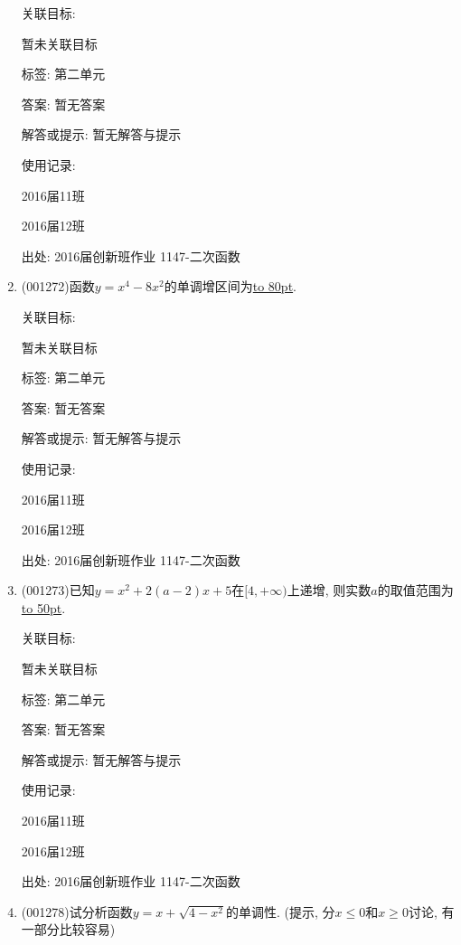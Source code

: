 \documentclass[10pt,a4paper]{article}
\newcommand{\blank}[1]{\underline{\hbox to #1pt{}}}
\begin{document}
\begin{enumerate}[1.]
关联目标:

暂未关联目标



标签: 第二单元

答案: 暂无答案

解答或提示: 暂无解答与提示

使用记录:

2016届11班				

2016届12班				


出处: 2016届创新班作业	1147-二次函数
\item { (001272)}函数$y=x^4-8x^2$的单调增区间为\blank{80}.


关联目标:

暂未关联目标



标签: 第二单元

答案: 暂无答案

解答或提示: 暂无解答与提示

使用记录:

2016届11班	

2016届12班	


出处: 2016届创新班作业	1147-二次函数
\item { (001273)}已知$y=x^2+2(a-2)x+5$在$[4,+\infty)$上递增, 则实数$a$的取值范围为\blank{50}.


关联目标:

暂未关联目标



标签: 第二单元

答案: 暂无答案

解答或提示: 暂无解答与提示

使用记录:

2016届11班	

2016届12班	


出处: 2016届创新班作业	1147-二次函数
\item { (001278)}试分析函数$y=x+\sqrt{4-x^2}$的单调性. (提示, 分$x\le0$和$x \ge 0$讨论, 有一部分比较容易)



\end{enumerate}
\end{document}

